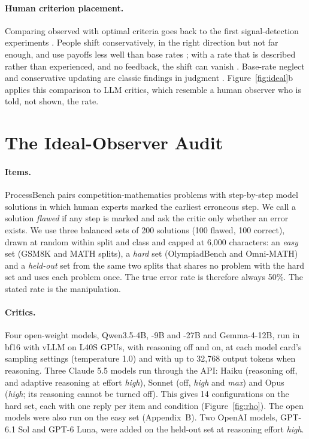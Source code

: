 \documentclass[letterpaper]{article} %
\begin{document}
\paragraph{Human criterion placement.} Comparing observed with optimal criteria goes back to the first signal-detection experiments \citep{green1966signal}. People shift conservatively, in the right direction but not far enough, and use payoffs less well than base rates \citep{ulehla1966optimality,healy1981probability,bohil2001category,maddox2002toward,rahnev2018suboptimality}; with a rate that is described rather than experienced, and no feedback, the shift can vanish \citep{estes1995interactions}. Base-rate neglect and conservative updating are classic findings in judgment \citep{kahneman1973psychology,edwards1982conservatism}. Figure~\ref{fig:ideal}b applies this comparison to LLM critics, which resemble a human observer who is told, not shown, the rate.

\section{The Ideal-Observer Audit}
\label{sec:method}

\paragraph{Items.} ProcessBench \citep{zheng2025processbench} pairs competition-mathematics problems with step-by-step model solutions in which human experts marked the earliest erroneous step. We call a solution \emph{flawed} if any step is marked and ask the critic only whether an error exists. We use three balanced sets of 200 solutions (100 flawed, 100 correct), drawn at random within split and class and capped at 6,000 characters: an \emph{easy} set (GSM8K and MATH splits), a \emph{hard} set (OlympiadBench and Omni-MATH) and a \emph{held-out} set from the same two splits that shares no problem with the hard set and uses each problem once. The true error rate is therefore always 50\%. The stated rate is the manipulation.

\paragraph{Critics.} Four open-weight models, Qwen3.5-4B, -9B and -27B and Gemma-4-12B, run in bf16 with vLLM on L40S GPUs, with reasoning off and on, at each model card's sampling settings (temperature 1.0) and with up to 32,768 output tokens when reasoning. Three Claude 5.5 models run through the API: Haiku (reasoning off, and adaptive reasoning at effort \emph{high}), Sonnet (off, \emph{high} and \emph{max}) and Opus (\emph{high}; its reasoning cannot be turned off). This gives 14 configurations on the hard set, each with one reply per item and condition (Figure~\ref{fig:rho}). The open models were also run on the easy set (Appendix~B). Two OpenAI models, GPT-6.1 Sol and GPT-6 Luna, were added on the held-out set at reasoning effort \emph{high}.
\end{document}
